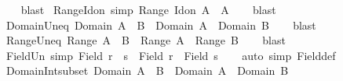 \begin{isabellebody}
%
\isadelimproof
\ \ %
\endisadelimproof
%
\isatagproof
{}\isamarkupfalse%
\ blast%
\endisatagproof
{\isafoldproof}%
%
\isadelimproof
\isanewline
%
\endisadelimproof
\isanewline
{}\isamarkupfalse%
\ Range{\isacharunderscore}{\kern0pt}Id{\isacharunderscore}{\kern0pt}on\ {\isacharbrackleft}{\kern0pt}simp{\isacharbrackright}{\kern0pt}{\isacharcolon}{\kern0pt}\ {\isachardoublequoteopen}Range\ {\isacharparenleft}{\kern0pt}Id{\isacharunderscore}{\kern0pt}on\ A{\isacharparenright}{\kern0pt}\ {\isacharequal}{\kern0pt}\ A{\isachardoublequoteclose}\isanewline
%
\isadelimproof
\ \ %
\endisadelimproof
%
\isatagproof
{}\isamarkupfalse%
\ blast%
\endisatagproof
{\isafoldproof}%
%
\isadelimproof
\isanewline
%
\endisadelimproof
\isanewline
{}\isamarkupfalse%
\ Domain{\isacharunderscore}{\kern0pt}Un{\isacharunderscore}{\kern0pt}eq{\isacharcolon}{\kern0pt}\ {\isachardoublequoteopen}Domain\ {\isacharparenleft}{\kern0pt}A\ {\isasymunion}\ B{\isacharparenright}{\kern0pt}\ {\isacharequal}{\kern0pt}\ Domain\ A\ {\isasymunion}\ Domain\ B{\isachardoublequoteclose}\isanewline
%
\isadelimproof
\ \ %
\endisadelimproof
%
\isatagproof
{}\isamarkupfalse%
\ blast%
\endisatagproof
{\isafoldproof}%
%
\isadelimproof
\isanewline
%
\endisadelimproof
\isanewline
{}\isamarkupfalse%
\ Range{\isacharunderscore}{\kern0pt}Un{\isacharunderscore}{\kern0pt}eq{\isacharcolon}{\kern0pt}\ {\isachardoublequoteopen}Range\ {\isacharparenleft}{\kern0pt}A\ {\isasymunion}\ B{\isacharparenright}{\kern0pt}\ {\isacharequal}{\kern0pt}\ Range\ A\ {\isasymunion}\ Range\ B{\isachardoublequoteclose}\isanewline
%
\isadelimproof
\ \ %
\endisadelimproof
%
\isatagproof
{}\isamarkupfalse%
\ blast%
\endisatagproof
{\isafoldproof}%
%
\isadelimproof
\isanewline
%
\endisadelimproof
\isanewline
{}\isamarkupfalse%
\ Field{\isacharunderscore}{\kern0pt}Un\ {\isacharbrackleft}{\kern0pt}simp{\isacharbrackright}{\kern0pt}{\isacharcolon}{\kern0pt}\ {\isachardoublequoteopen}Field\ {\isacharparenleft}{\kern0pt}r\ {\isasymunion}\ s{\isacharparenright}{\kern0pt}\ {\isacharequal}{\kern0pt}\ Field\ r\ {\isasymunion}\ Field\ s{\isachardoublequoteclose}\isanewline
%
\isadelimproof
\ \ %
\endisadelimproof
%
\isatagproof
{}\isamarkupfalse%
\ {\isacharparenleft}{\kern0pt}auto\ simp{\isacharcolon}{\kern0pt}\ Field{\isacharunderscore}{\kern0pt}def{\isacharparenright}{\kern0pt}%
\endisatagproof
{\isafoldproof}%
%
\isadelimproof
\isanewline
%
\endisadelimproof
\isanewline
{}\isamarkupfalse%
\ Domain{\isacharunderscore}{\kern0pt}Int{\isacharunderscore}{\kern0pt}subset{\isacharcolon}{\kern0pt}\ {\isachardoublequoteopen}Domain\ {\isacharparenleft}{\kern0pt}A\ {\isasyminter}\ B{\isacharparenright}{\kern0pt}\ {\isasymsubseteq}\ Domain\ A\ {\isasyminter}\ Domain\ B{\isachardoublequoteclose}\isanewline

\end{isabellebody}
